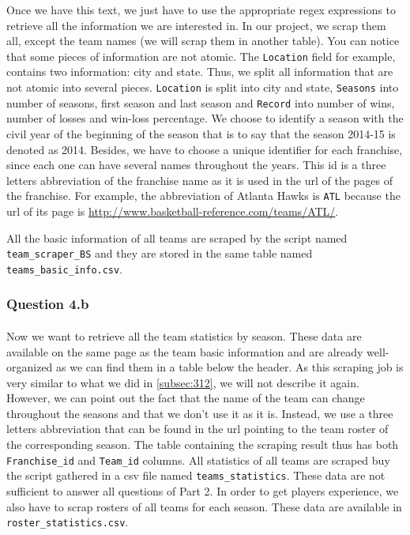 	Once we have this text, we just have to use the appropriate regex expressions to retrieve all the information we are interested in. In our project, we scrap them all, except the team names (we will scrap them in another table). You can notice that some pieces of information are not atomic. The \verb|Location| field for example, contains two information: city and state. Thus, we split all information that are not atomic into several pieces. \verb|Location| is split into city and state, \verb|Seasons| into number of seasons, first season and last season and \verb|Record| into number of wins, number of losses and win-loss percentage. We choose to identify a season with the civil year of the beginning of the season that is to say that the season 2014-15 is denoted as 2014. Besides, we have to choose a unique identifier for each franchise, since each one can have several names throughout the years. This id is a three letters abbreviation of the franchise name as it is used in the url of the pages of the franchise. For example, the abbreviation of Atlanta Hawks is \verb|ATL| because the url of its page is \url{http://www.basketball-reference.com/teams/ATL/}.

	All the basic information of all teams are scraped by the script named \verb|team_scraper_BS| and they are stored in the same table named \verb|teams_basic_info.csv|. 

\subsubsection{Question 4.b}
\label{subsubsec:314b}

\paragraph{}Now we want to retrieve all the team statistics by season. These data are available on the same page as the team basic information and are already well-organized as we can find them in a table below the header. As this scraping job is very similar to what we did in \ref{subsec:312}, we will not describe it again. However, we can point out the fact that the name of the team can change throughout the seasons and that we don't use it as it is. Instead, we use a three letters abbreviation that can be found in the url pointing to the team roster of the corresponding season. The table containing the scraping result thus has both \verb|Franchise_id| and \verb|Team_id| columns. All statistics of all teams are scraped buy the script gathered in a csv file named \verb|teams_statistics|.
These data are not sufficient to answer all questions of Part 2. In order to get players experience, we also have to scrap rosters of all teams for each season. These data are available in  \verb|roster_statistics.csv|.
